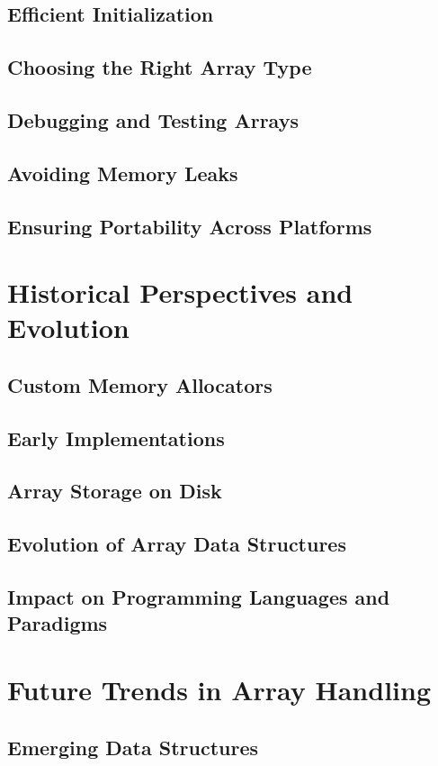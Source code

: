 \documentclass[12pt, oneside]{book}
\begin{document}
\section{Efficient Initialization}
\section{Choosing the Right Array Type}
\section{Debugging and Testing Arrays}
\section{Avoiding Memory Leaks}
\section{Ensuring Portability Across Platforms}

\chapter{Historical Perspectives and Evolution}
\section{Custom Memory Allocators}\section{Early Implementations}
\section{Array Storage on Disk}\section{Evolution of Array Data Structures}
\section{Impact on Programming Languages and Paradigms}

\chapter{Future Trends in Array Handling}
\section{Emerging Data Structures}
\end{document}
